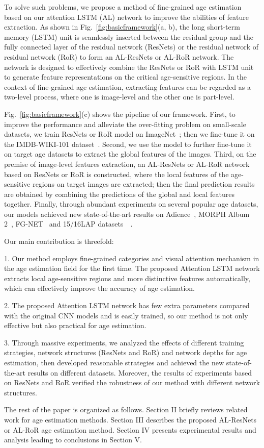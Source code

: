 \documentclass[journal]{IEEEtran}
\begin{document}
\par
To solve such problems, we propose a method of fine-grained age estimation based on our attention LSTM (AL) network to improve the abilities of feature extraction. As shown in Fig.~\ref{fig:basicframework}(a, b), the long short-term memory (LSTM) unit is seamlessly inserted between the residual group and the fully connected layer of the residual network (ResNets) or the residual network of residual network (RoR) to form an AL-ResNets or AL-RoR network. The network is designed to effectively combine the ResNets or RoR with LSTM unit to generate feature representations on the critical age-sensitive regions. In the context of fine-grained age estimation, extracting features can be regarded as a two-level process, where one is image-level and the other one is part-level.
\par
Fig.~\ref{fig:basicframework}(c) shows the pipeline of our framework. First, to improve the performance and alleviate the over-fitting problem on small-scale datasets, we train ResNets or RoR model on ImageNet~\cite{ref-00}; then we fine-tune it on the IMDB-WIKI-101 dataset~\cite{ref-22}. Second, we use the model to further fine-tune it on target age datasets to extract the global features of the images. Third, on the premise of image-level features extraction, an AL-ResNets or AL-RoR network based on ResNets or RoR is constructed, where the local features of the age-sensitive regions on target images are extracted; then the final prediction results are obtained by combining the predictions of the global and local features together. Finally, through abundant experiments on several popular age datasets, our models achieved new state-of-the-art results on Adience~\cite{ref-1}, MORPH Album 2~\cite{ref-31}, FG-NET~\cite{ref-20} and 15/16LAP datasets~\cite{ref-46}~\cite{ref-56}.
\par
Our main contribution is threefold:
\par
1. Our method employs fine-grained categories and visual attention mechanism in the age estimation field for the first time. The proposed Attention LSTM network extracts local age-sensitive regions and more distinctive features automatically, which can effectively improve the accuracy of age estimation.
\par
2. The proposed Attention LSTM network has few extra parameters compared with the original CNN models and is easily trained, so our method is not only effective but also practical for age estimation.
\par
3. Through massive experiments, we analyzed the effects of different training strategies, network structures (ResNets and RoR) and network depths for age estimation, then developed reasonable strategies and achieved the new state-of-the-art results on different datasets. Moreover, the results of experiments based on ResNets and RoR verified the robustness of our method with different network structures.
\par
The rest of the paper is organized as follows. Section II briefly reviews related work for age estimation methods. Section III describes the proposed AL-ResNets or AL-RoR age estimation method. Section IV presents experimental results and analysis leading to conclusions in Section V.
\end{document}

